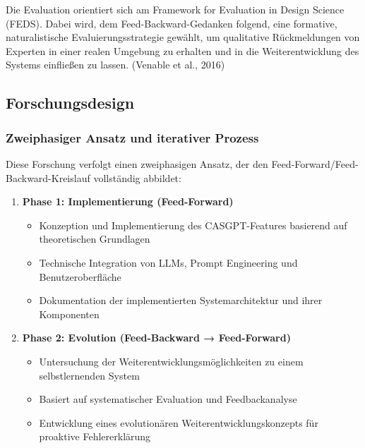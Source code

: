 \documentclass[
  a4paper,
  12pt,
  oneside,
  open=any,
  BCOR=12mm,
  DIV=14,
  parskip=half*,
  headsepline,
  footsepline,
  pointlessnumbers,
  liststotoc,
  numbers=noenddot,
  listof=totoc]{scrartcl}
\providecommand{\tightlist}{%
  \setlength{\itemsep}{0pt}\setlength{\parskip}{0pt}}\usepackage{longtable,booktabs,array}
\begin{document}
Die Evaluation orientiert sich am Framework for Evaluation in Design
Science (FEDS). Dabei wird, dem Feed-Backward-Gedanken folgend, eine
formative, naturalistische Evaluierungsstrategie gewählt, um qualitative
Rückmeldungen von Experten in einer realen Umgebung zu erhalten und in
die Weiterentwicklung des Systems einfließen zu lassen. (Venable et al.,
2016)

\subsection{Forschungsdesign}\label{forschungsdesign}

\subsubsection{Zweiphasiger Ansatz und iterativer
Prozess}\label{zweiphasiger-ansatz-und-iterativer-prozess}

Diese Forschung verfolgt einen zweiphasigen Ansatz, der den
Feed-Forward/Feed-Backward-Kreislauf vollständig abbildet:

\begin{enumerate}
\def\labelenumi{\arabic{enumi}.}
\tightlist
\item
  \textbf{Phase 1: Implementierung (Feed-Forward)}

  \begin{itemize}
  \tightlist
  \item
    Konzeption und Implementierung des CASGPT-Features basierend auf
    theoretischen Grundlagen
  \item
    Technische Integration von LLMs, Prompt Engineering und
    Benutzeroberfläche
  \item
    Dokumentation der implementierten Systemarchitektur und ihrer
    Komponenten
  \end{itemize}
\item
  \textbf{Phase 2: Evolution (Feed-Backward → Feed-Forward)}

  \begin{itemize}
  \tightlist
  \item
    Untersuchung der Weiterentwicklungsmöglichkeiten zu einem
    selbstlernenden System
  \item
    Basiert auf systematischer Evaluation und Feedbackanalyse
  \item
    Entwicklung eines evolutionären Weiterentwicklungskonzepts für
    proaktive Fehlererklärung
  \end{itemize}
\end{enumerate}
\end{document}
